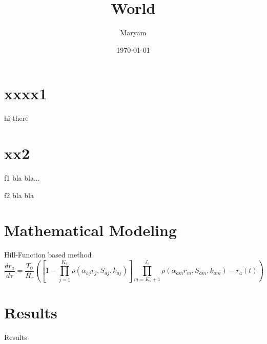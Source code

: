 \documentclass[12pt]{beamer}
\title[Hello]{World}
\author{Maryam}
\institute[AI]
{AI Lab \\ %
\medskip
\textit{xx@xx.com} %

}
\date{\today}
\begin{document}


\begin{frame}
\titlepage %
\end{frame}



\section{xxxx1} %
\begin{frame}{hi there}
\end{frame}


\section{xx2} %

\begin{frame}{f1}
bla bla...
\end{frame}


\begin{frame}{f2}
bla bla
\end{frame}


\section{Mathematical Modeling}

\begin{frame}{Hill-Function based method}
\begin{equation*} \label{eq: main odes10-main1-last}
\frac{dr_a}{d\tau}=\frac{T_0}{H_r} \left(\left[1-\prod_{j=1}^{K_a}\rho(\alpha_{aj} r_{j},S_{aj}, k_{aj})\right]\prod_{m=K_a+1}^{J_a}\rho(\alpha_{am} r_{m},S_{am}, k_{am})-r_a(t)\right)\end{equation*}

\end{frame}


\section{Results}

\begin{frame}{Results}


\end{frame}

\end{document}
